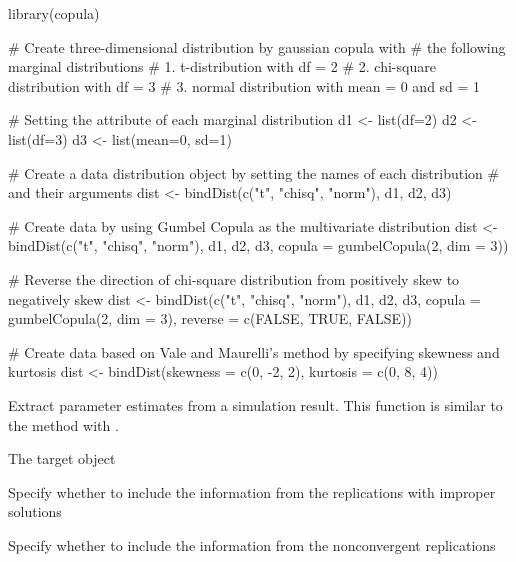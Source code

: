 \documentclass[a4paper]{book}
\begin{document}
\begin{Examples}
\begin{ExampleCode}
library(copula)

# Create three-dimensional distribution by gaussian copula with 
# the following marginal distributions
#   1. t-distribution with df = 2
# 	2. chi-square distribution with df = 3
#	3. normal distribution with mean = 0 and sd = 1

# Setting the attribute of each marginal distribution
d1 <- list(df=2)
d2 <- list(df=3)
d3 <- list(mean=0, sd=1)

# Create a data distribution object by setting the names of each distribution
# and their arguments
dist <- bindDist(c("t", "chisq", "norm"), d1, d2, d3)

# Create data by using Gumbel Copula as the multivariate distribution
dist <- bindDist(c("t", "chisq", "norm"), d1, d2, d3, copula = gumbelCopula(2, dim = 3))

# Reverse the direction of chi-square distribution from positively skew to negatively skew
dist <- bindDist(c("t", "chisq", "norm"), d1, d2, d3, copula = gumbelCopula(2, dim = 3),
	reverse = c(FALSE, TRUE, FALSE))
	
# Create data based on Vale and Maurelli's method by specifying skewness and kurtosis
dist <- bindDist(skewness = c(0, -2, 2), kurtosis = c(0, 8, 4))
\end{ExampleCode}
\end{Examples}
%
\begin{Description}\relax
Extract parameter estimates from a simulation result. This function is similar to the  method with .
\end{Description}
%
\begin{Arguments}
\begin{ldescription}
\item[\code{object}] 
The target  object

\item[\code{improper}] 
Specify whether to include the information from the replications with improper solutions

\item[\code{nonconverged}] 
Specify whether to include the information from the nonconvergent replications

\end{ldescription}
\end{Arguments}
\end{document}
